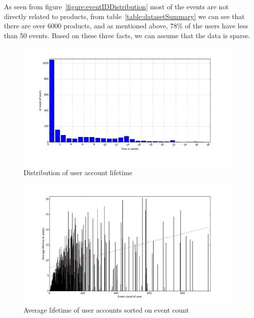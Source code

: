        As seen from figure~\ref{figure:eventIDDistribution} most of the events are not directly related to products, from table~\ref{table:datasetSummary} we can see that there are over 6000 products, and as mentioned above, 78\% of the users have less than 50 events. Based on these three facts, we can assume that the data is sparse.

    \begin{figure}[H]
        \includegraphics[width=5in]{image/userTimespansdistribution.png}
        \centering
        \caption{Distribution of user account lifetime}
    \label{figure:userTimespandist}
    \end{figure}


    \begin{figure}[H]
        \includegraphics[width=5in]{image/avglifetimeoncountuser.png}
        \centering
        \caption{Average lifetime of user accounts sorted on event count}
    \label{figure:avglifetimeoncountuser}
    \end{figure}


